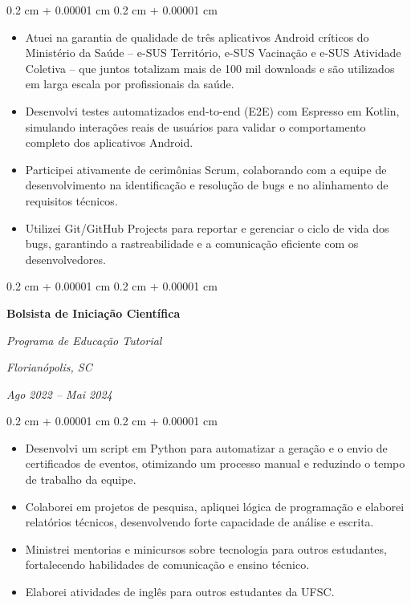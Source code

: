 \documentclass[10pt, letterpaper]{article}
\newenvironment{highlights}{
    \begin{itemize}[
        topsep=0.10 cm,
        parsep=0.10 cm,
        partopsep=0pt,
        itemsep=0pt,
        leftmargin=0.4 cm + 10pt
    ]
}{
    \end{itemize}
} %
\newenvironment{onecolentry}{
    \begin{adjustwidth}{
        0.2 cm + 0.00001 cm
    }{
        0.2 cm + 0.00001 cm
    }
}{
    \end{adjustwidth}
} %
\newenvironment{twocolentry}[2][]{
    \onecolentry
    \def\secondColumn{#2}
    \setcolumnwidth{\fill, 4.5 cm}
    \begin{paracol}{2}
}{
    \switchcolumn \raggedleft \secondColumn
    \end{paracol}
    \endonecolentry
} %
\begin{document}
        \vspace{0.10 cm}
        \begin{onecolentry}
            \begin{highlights}
                \item Atuei na garantia de qualidade de três aplicativos Android críticos do Ministério da Saúde -- e-SUS Território, e-SUS Vacinação e e-SUS Atividade Coletiva -- que juntos totalizam mais de 100 mil downloads e são utilizados em larga escala por profissionais da saúde.
                \item Desenvolvi testes automatizados end-to-end (E2E) com Espresso em Kotlin, simulando interações reais de usuários para validar o comportamento completo dos aplicativos Android.
                \item Participei ativamente de cerimônias Scrum, colaborando com a equipe de desenvolvimento na identificação e resolução de bugs e no alinhamento de requisitos técnicos.
                \item Utilizei Git/GitHub Projects para reportar e gerenciar o ciclo de vida dos bugs, garantindo a rastreabilidade e a comunicação eficiente com os desenvolvedores.
            \end{highlights}
        \end{onecolentry}


                \vspace{0.2 cm}

        \begin{twocolentry}{
        \textit{Florianópolis, SC}    
            
        \textit{Ago 2022 – Mai 2024}}
            \textbf{Bolsista de Iniciação Científica}
            
            \textit{Programa de Educação Tutorial}
        \end{twocolentry}

        \vspace{0.10 cm}
        \begin{onecolentry}
            \begin{highlights}
                \item Desenvolvi um script em Python para automatizar a geração e o envio de certificados de eventos, otimizando um processo manual e reduzindo o tempo de trabalho da equipe.
                \item Colaborei em projetos de pesquisa, apliquei lógica de programação e elaborei
                relatórios técnicos, desenvolvendo forte capacidade de análise e escrita.
                \item Ministrei mentorias e minicursos sobre tecnologia para outros estudantes, fortalecendo habilidades de comunicação e ensino técnico.
                \item Elaborei atividades de inglês para outros estudantes da UFSC.
                
            \end{highlights}
        \end{onecolentry}
\end{document}
